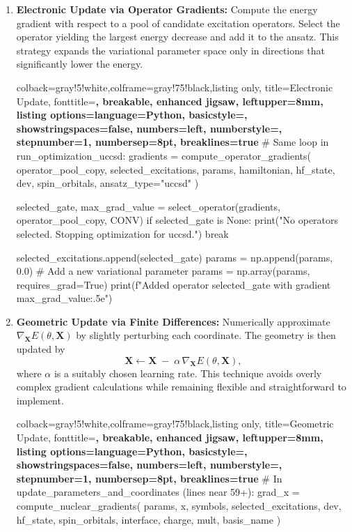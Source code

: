 \begin{enumerate}
    \item \textbf{Electronic Update via Operator Gradients:}
    Compute the energy gradient with respect to a pool of candidate excitation operators. Select the operator yielding the largest energy decrease and add it to the ansatz. This strategy expands the variational parameter space only in directions that significantly lower the energy.
    \begin{tcblisting}{colback=gray!5!white,colframe=gray!75!black,listing only,
        title=Electronic Update, fonttitle=\bfseries, breakable, enhanced jigsaw, leftupper=8mm,
        listing options={language=Python, basicstyle=\ttfamily\small,
        showstringspaces=false, numbers=left, numberstyle=\footnotesize,
        stepnumber=1, numbersep=8pt, breaklines=true}}
# Same loop in run_optimization_uccsd:
gradients = compute_operator_gradients(
    operator_pool_copy,
    selected_excitations,
    params,
    hamiltonian,
    hf_state,
    dev,
    spin_orbitals,
    ansatz_type="uccsd"
)

selected_gate, max_grad_value = select_operator(gradients, operator_pool_copy, CONV)
if selected_gate is None:
    print("No operators selected. Stopping optimization for uccsd.")
    break

selected_excitations.append(selected_gate)
params = np.append(params, 0.0)  # Add a new variational parameter
params = np.array(params, requires_grad=True)
print(f"Added operator {selected_gate} with gradient {max_grad_value:.5e}")
    \end{tcblisting}

    \item \textbf{Geometric Update via Finite Differences:}
    Numerically approximate \(\nabla_{\mathbf{X}}E(\theta, \mathbf{X})\) by slightly perturbing each coordinate. The geometry is then updated by
    \[
    \mathbf{X} \leftarrow \mathbf{X} \;-\; \alpha\, \nabla_{\mathbf{X}} E(\theta, \mathbf{X}),
    \]
    where \(\alpha\) is a suitably chosen learning rate. This technique avoids overly complex gradient calculations while remaining flexible and straightforward to implement.
    \begin{tcblisting}{colback=gray!5!white,colframe=gray!75!black,listing only,
        title=Geometric Update, fonttitle=\bfseries, breakable, enhanced jigsaw, leftupper=8mm,
        listing options={language=Python, basicstyle=\ttfamily\small,
        showstringspaces=false, numbers=left, numberstyle=\footnotesize,
        stepnumber=1, numbersep=8pt, breaklines=true}}
# In update_parameters_and_coordinates (lines near 59+):
grad_x = compute_nuclear_gradients(
    params, x, symbols, selected_excitations, dev,
    hf_state, spin_orbitals, interface, charge, mult, basis_name
)


\end{tcblisting}
\end{enumerate}
